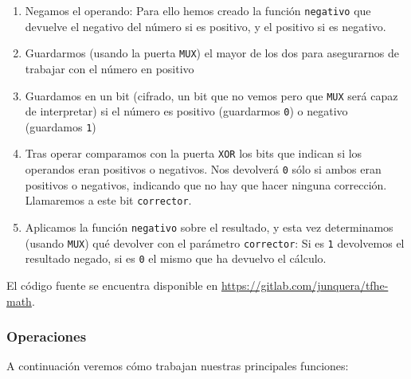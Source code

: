 \begin{enumerate}
  \begin{enumerate}
    \item Negamos el operando: Para ello hemos creado la función \texttt{negativo} que devuelve el negativo del número si es positivo, y el positivo si es negativo.
    \item Guardarmos (usando la puerta \texttt{MUX}) el mayor de los dos para asegurarnos de trabajar con el número en positivo
    \item Guardamos en un bit (cifrado, un bit que no vemos pero que \texttt{MUX} será capaz de interpretar) si el número es positivo (guardarmos \texttt{0}) o negativo (guardamos \texttt{1})
    \item Tras operar comparamos con la puerta \texttt{XOR} los bits que indican si los operandos eran positivos o negativos. Nos devolverá \texttt{0} sólo si ambos eran positivos o negativos, indicando que no hay que hacer ninguna corrección. Llamaremos a este bit \texttt{corrector}.
    \item Aplicamos la función \texttt{negativo} sobre el resultado, y esta vez determinamos (usando \texttt{MUX}) qué devolver con el parámetro \texttt{corrector}: Si es \texttt{1} devolvemos el resultado negado, si es \texttt{0} el mismo que ha devuelvo el cálculo.
  \end{enumerate}

\end{enumerate}

El código fuente se encuentra disponible en \url{https://gitlab.com/junquera/tfhe-math}.

\subsubsection{Operaciones}
\label{tag:tfhe-math-ops}

A continuación veremos cómo trabajan nuestras principales funciones:

